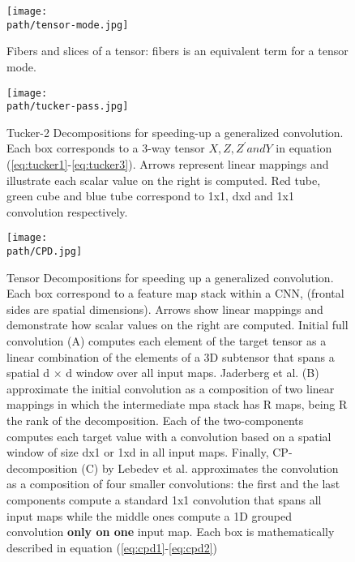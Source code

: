 \begin{figure}[h!]
 \centering
 \texttt{[image: \\path/tensor-mode.jpg]} 
 \caption{Fibers and slices of a tensor: fibers is an equivalent term for a tensor mode.}
 \label{fig:tensor-fibers}
\end{figure}

\begin{figure}[h!]
 \centering
 \texttt{[image: \\path/tucker-pass.jpg]} 
 \caption{Tucker-2  Decompositions  for  speeding-up  a generalized convolution. Each box corresponds to a 3-way tensor $X, Z, Z^' and Y$ in equation (\ref{eq:tucker1}-\ref{eq:tucker3}). Arrows represent linear mappings 
and illustrate each scalar value on the right is computed. Red tube, green cube and blue tube correspond to 
1x1, dxd and 1x1 convolution respectively.}
 \label{fig:tucker-pass}
\end{figure}


\begin{figure}[h!]
 \centering
 \texttt{[image: \\path/CPD.jpg]} 
 \caption{Tensor Decompositions for speeding up a generalized convolution. Each box correspond to a feature map stack within a CNN, (frontal sides are spatial dimensions). Arrows show linear mappings and demonstrate how scalar values on the right are computed. Initial full convolution (A) computes each element of the target tensor as a linear combination of the elements of a 3D subtensor that spans a spatial d × d window over all input maps. 
Jaderberg et al. (B) approximate the initial convolution as a composition of two linear mappings in which the intermediate mpa stack has R  maps, being R the rank of the decomposition. Each of the two-components 
computes each target value with a convolution based on a spatial window of size dx1 or 1xd in all input maps. Finally, CP-decomposition (C) by Lebedev et al. approximates the convolution as a composition of four smaller convolutions: the first and the last components compute a standard 1x1 convolution that spans all input maps while the middle ones compute a 1D grouped convolution \textbf{only on one} input map. Each box is mathematically described in equation (\ref{eq:cpd1}-\ref{eq:cpd2})}
 \label{fig:cpd-pass}
\end{figure}


